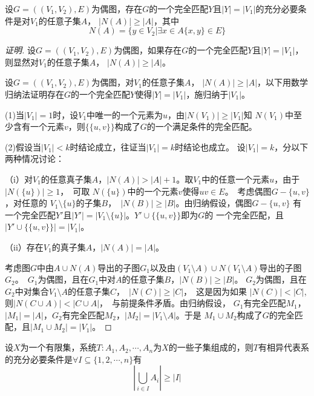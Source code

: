     \begin{Thm}
    设$G=((V_1,V_2),E)$为偶图，存在$G$的一个完全匹配$Y$且$|Y| = |V_1|$的充分必要条件是对$V_1$的任意子集$A$， $|N(A)| \geq |A|$，其中\[N(A) = \{y\in V_2|\exists x \in A \{x,y\} \in E\}\]
  \end{Thm}
  \begin{proof}[证明]
设$G=((V_1,V_2),E)$为偶图，如果存在$G$的一个完全匹配$Y$且$|Y| = |V_1|$，则显然对$V_1$的任意子集$A$， $|N(A)| \geq |A|$。

设$G=((V_1,V_2),E)$为偶图，对$V_1$的任意子集$A$， $|N(A)| \geq |A|$，以下用数学归纳法证明存在$G$的一个完全匹配$Y$使得$|Y| = |V_1|$，施归纳于$|V_1|$。

(1)当$|V_1|=1$时，设$V_1$中唯一的一个元素为$u$，由$|N(V_1)| \geq |V_1|$知
$N(V_1)$中至少含有一个元素$v$，则$\{\{u,v\}\}$构成了$G$的一个满足条件的完全匹配。

(2)假设当$|V_1|<k$时结论成立，往证当$|V_1|=k$时结论也成立。
设$|V_1|=k$，分以下两种情况讨论：

（i）对$V_1$的任意真子集$A$，$|N(A)| > |A| + 1$。取$V_1$中的任意一个元素$u$，由于$|N(\{u\})| \geq 1$，　可取
$N(\{u\})$中的一个元素$v$使得$uv \in E$。　考虑偶图$G-\{u,v\}$，对任意的
$V_1\setminus \{u\}$的子集$B$，　$|N(B)| \geq |B|$。由归纳假设，偶图$G-\{u,v\}$
有一个完全匹配$Y'$且$|Y'| = |V_1\setminus \{u\}|$。$Y' \cup \{\{u,v\}\}$即为$G$的
一个完全匹配，且$|Y' \cup \{\{u,v\}\}| = |V_1|$。

（ii）存在$V_1$的真子集$A$，$|N(A)| = |A|$。

考虑图$G$中由$A \cup N(A)$导出的子图$G_1$以及由$(V_1\setminus A) \cup
N(V_1\setminus A)$导出的子图$G_2$。　$G_1$为偶图，且在$G_1$中对$A$的任意子集$B$，$|N(B)| \geq |B|$。
$G_2$为偶图，且在$G_2$中对集合$V_1\setminus A$的任意子集$C$，　$|N(C)| \geq |C|$，　这是因为如果
$|N(C)| < |C|$, 则$|N(C \cup A)| < |C \cup A|$，　与前提条件矛盾。由归纳假设，
$G_1$有完全匹配$M_1$，$|M_1|=|A|$，$G_2$有完全匹配$M_2$，$|M_2|=|V_1\setminus A|$。于是
$M_1\cup M_2$构成了$G$的完全匹配，且$|M_1\cup M_2| = |V_1|$。
  \end{proof}


  \begin{Thm}
    设$X$为一个有限集，系统$T:A_1,A_2,\cdots,A_n$为$X$的一些子集组成的，则$T$有相异代表系的充分必要条件是$\forall I \subseteq \{1,2,\cdots, n\}$有
    \[|\bigcup_{i\in I}A_i|\geq |I|\]
  \end{Thm}



\chapter{}
